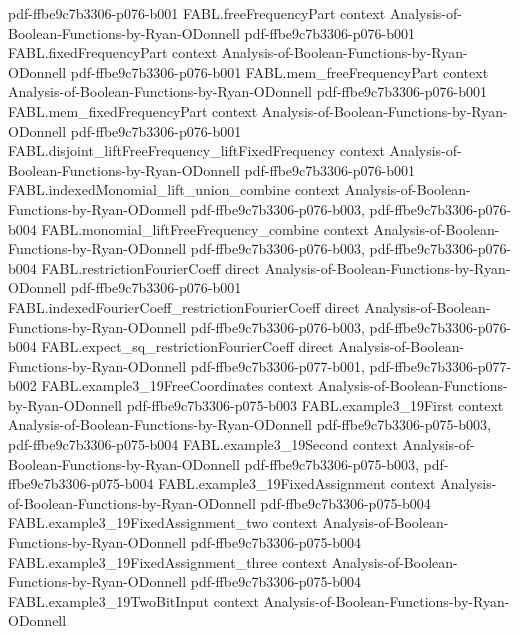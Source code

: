 \begin{theorem}
  {pdf-ffbe9c7b3306-p076-b001}
\proofstep
  {FABL.freeFrequencyPart}
  {context}
  {Analysis-of-Boolean-Functions-by-Ryan-ODonnell}
  {pdf-ffbe9c7b3306-p076-b001}
\proofstep
  {FABL.fixedFrequencyPart}
  {context}
  {Analysis-of-Boolean-Functions-by-Ryan-ODonnell}
  {pdf-ffbe9c7b3306-p076-b001}
\proofstep
  {FABL.mem_freeFrequencyPart}
  {context}
  {Analysis-of-Boolean-Functions-by-Ryan-ODonnell}
  {pdf-ffbe9c7b3306-p076-b001}
\proofstep
  {FABL.mem_fixedFrequencyPart}
  {context}
  {Analysis-of-Boolean-Functions-by-Ryan-ODonnell}
  {pdf-ffbe9c7b3306-p076-b001}
\proofstep
  {FABL.disjoint_liftFreeFrequency_liftFixedFrequency}
  {context}
  {Analysis-of-Boolean-Functions-by-Ryan-ODonnell}
  {pdf-ffbe9c7b3306-p076-b001}
\proofstep
  {FABL.indexedMonomial_lift_union_combine}
  {context}
  {Analysis-of-Boolean-Functions-by-Ryan-ODonnell}
  {pdf-ffbe9c7b3306-p076-b003,
    pdf-ffbe9c7b3306-p076-b004}
\proofstep
  {FABL.monomial_liftFreeFrequency_combine}
  {context}
  {Analysis-of-Boolean-Functions-by-Ryan-ODonnell}
  {pdf-ffbe9c7b3306-p076-b003,
    pdf-ffbe9c7b3306-p076-b004}
\proofstep
  {FABL.restrictionFourierCoeff}
  {direct}
  {Analysis-of-Boolean-Functions-by-Ryan-ODonnell}
  {pdf-ffbe9c7b3306-p076-b001}
\proofstep
  {FABL.indexedFourierCoeff_restrictionFourierCoeff}
  {direct}
  {Analysis-of-Boolean-Functions-by-Ryan-ODonnell}
  {pdf-ffbe9c7b3306-p076-b003,
    pdf-ffbe9c7b3306-p076-b004}
\proofstep
  {FABL.expect_sq_restrictionFourierCoeff}
  {direct}
  {Analysis-of-Boolean-Functions-by-Ryan-ODonnell}
  {pdf-ffbe9c7b3306-p077-b001,
    pdf-ffbe9c7b3306-p077-b002}
\proofstep
  {FABL.example3_19FreeCoordinates}
  {context}
  {Analysis-of-Boolean-Functions-by-Ryan-ODonnell}
  {pdf-ffbe9c7b3306-p075-b003}
\proofstep
  {FABL.example3_19First}
  {context}
  {Analysis-of-Boolean-Functions-by-Ryan-ODonnell}
  {pdf-ffbe9c7b3306-p075-b003,
    pdf-ffbe9c7b3306-p075-b004}
\proofstep
  {FABL.example3_19Second}
  {context}
  {Analysis-of-Boolean-Functions-by-Ryan-ODonnell}
  {pdf-ffbe9c7b3306-p075-b003,
    pdf-ffbe9c7b3306-p075-b004}
\proofstep
  {FABL.example3_19FixedAssignment}
  {context}
  {Analysis-of-Boolean-Functions-by-Ryan-ODonnell}
  {pdf-ffbe9c7b3306-p075-b004}
\proofstep
  {FABL.example3_19FixedAssignment_two}
  {context}
  {Analysis-of-Boolean-Functions-by-Ryan-ODonnell}
  {pdf-ffbe9c7b3306-p075-b004}
\proofstep
  {FABL.example3_19FixedAssignment_three}
  {context}
  {Analysis-of-Boolean-Functions-by-Ryan-ODonnell}
  {pdf-ffbe9c7b3306-p075-b004}
\proofstep
  {FABL.example3_19TwoBitInput}
  {context}
  {Analysis-of-Boolean-Functions-by-Ryan-ODonnell}

\end{theorem}
